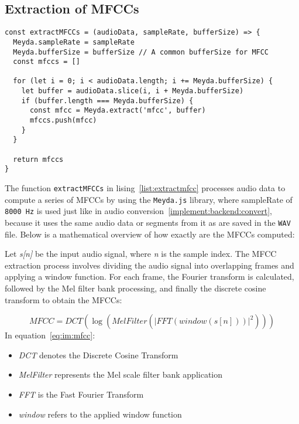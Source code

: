 \subsection{Extraction of MFCCs}

\begin{clisting}
\label{list:extractmfcc}
\begin{verbatim}
const extractMFCCs = (audioData, sampleRate, bufferSize) => {
  Meyda.sampleRate = sampleRate
  Meyda.bufferSize = bufferSize // A common bufferSize for MFCC
  const mfccs = []

  for (let i = 0; i < audioData.length; i += Meyda.bufferSize) {
    let buffer = audioData.slice(i, i + Meyda.bufferSize)
    if (buffer.length === Meyda.bufferSize) {
      const mfcc = Meyda.extract('mfcc', buffer)
      mfccs.push(mfcc)
    }
  }

  return mfccs
}
\end{verbatim}
\end{clisting}

The function \texttt{extractMFCCs} in lising~\ref{list:extractmfcc} processes audio data to compute a series of MFCCs by using the \texttt{Meyda.js} library, where sampleRate of \texttt{8000 Hz} is used just like in audio conversion~\ref{implement:backend:convert}, because it uses the same audio data or segments from it as are saved in the \texttt{WAV} file. Below is a mathematical overview of how exactly are the MFCCs computed:

Let \textit{s[n]} be the input audio signal, where \textit{n} is the sample index. The MFCC extraction process involves dividing the audio signal into overlapping frames and applying a window function. For each frame, the Fourier transform is calculated, followed by the Mel filter bank processing, and finally the discrete cosine transform to obtain the MFCCs:

\begin{equation}
\label{eq:im:mfcc}
M F C C=D C T\left(\log \left(M e l F i l t e r\left(|F F T(w i n d o w(s[n]))|^2\right)\right)\right)
\end{equation}
In equation~\ref{eq:im:mfcc}:
\begin{itemize}
    \item \textit{DCT} denotes the Discrete Cosine Transform
    \item \textit{MelFilter} represents the Mel scale filter bank application
    \item \textit{FFT} is the Fast Fourier Transform
    \item \textit{window} refers to the applied window function
\end{itemize}

